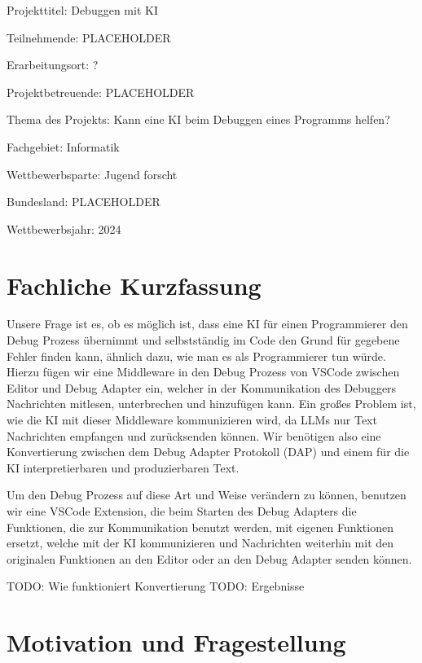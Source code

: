\documentclass[a4paper,12pt,ngerman]{scrartcl}
\begin{document}
\begin{titlepage}
	Projekttitel: Debuggen mit KI
	\vspace{1cm}
	
	Teilnehmende: PLACEHOLDER
	
	Erarbeitungsort: ?
	
	Projektbetreuende: PLACEHOLDER
	
	Thema des Projekts: Kann eine KI beim Debuggen eines Programms helfen?
	
	Fachgebiet: Informatik
	
	Wettbewerbsparte: Jugend forscht
	
	Bundesland: PLACEHOLDER
	
	Wettbewerbsjahr: 2024
	
	\vspace{2cm}
	\vfill
\end{titlepage}
\clearpage
\tableofcontents
\clearpage

\section{Fachliche Kurzfassung}

Unsere Frage ist es, ob es möglich ist, dass eine KI für einen Programmierer den Debug Prozess übernimmt und selbstständig im Code den Grund für gegebene Fehler finden kann, ähnlich dazu, wie man es als Programmierer tun würde. Hierzu fügen wir eine Middleware in den Debug Prozess von VSCode zwischen Editor und Debug Adapter ein, welcher in der Kommunikation des Debuggers Nachrichten mitlesen, unterbrechen und hinzufügen kann. Ein großes Problem ist, wie die KI mit dieser Middleware kommunizieren wird, da LLMs nur Text Nachrichten empfangen und zurücksenden können. Wir benötigen also eine Konvertierung zwischen dem Debug Adapter Protokoll (DAP) und einem für die KI interpretierbaren und produzierbaren Text.

Um den Debug Prozess auf diese Art und Weise verändern zu können, benutzen wir eine VSCode Extension, die beim Starten des Debug Adapters die Funktionen, die zur Kommunikation benutzt werden, mit eigenen Funktionen ersetzt, welche mit der KI kommunizieren und Nachrichten weiterhin mit den originalen Funktionen an den Editor oder an den Debug Adapter senden können.

TODO: Wie funktioniert Konvertierung
TODO: Ergebnisse

\section{Motivation und Fragestellung}
\end{document}
